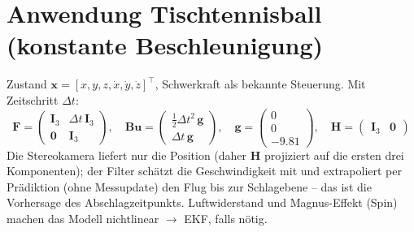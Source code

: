 \section{Anwendung Tischtennisball (konstante Beschleunigung)}
Zustand $\bm{x} = [x,y,z,\dot{x},\dot{y},\dot{z}]^\top$, Schwerkraft als
bekannte Steuerung. Mit Zeitschritt $\Delta t$:
\begin{equation}
\bm{F} = \begin{pmatrix} \bm{I}_3 & \Delta t\,\bm{I}_3 \\ \bm{0} & \bm{I}_3 \end{pmatrix},\quad
\bm{B}\bm{u} = \begin{pmatrix} \tfrac{1}{2}\Delta t^2\,\bm{g} \\ \Delta t\,\bm{g} \end{pmatrix},\quad
\bm{g}=\begin{pmatrix}0\\0\\-9.81\end{pmatrix},\quad
\bm{H} = \begin{pmatrix} \bm{I}_3 & \bm{0} \end{pmatrix}
\end{equation}
Die Stereokamera liefert nur die Position (daher $\bm{H}$ projiziert auf die
ersten drei Komponenten); der Filter schätzt die Geschwindigkeit mit und
extrapoliert per Prädiktion (ohne Messupdate) den Flug bis zur Schlagebene --
das ist die Vorhersage des Abschlagzeitpunkts. Luftwiderstand und Magnus-Effekt
(Spin) machen das Modell nichtlinear $\rightarrow$ EKF, falls nötig.
